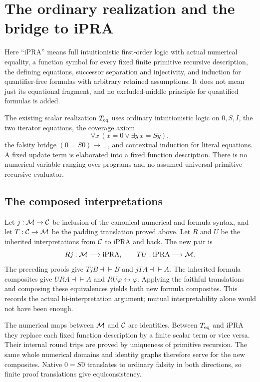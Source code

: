 \section{The ordinary realization and the bridge to iPRA}
\label{sec:new-bridge}

Here ``iPRA'' means full intuitionistic first-order logic with actual
numerical equality, a function symbol for every fixed finite primitive
recursive description, the defining equations, successor separation
and injectivity, and induction for quantifier-free formulas with
arbitrary retained assumptions.  It does not mean just its equational
fragment, and no excluded-middle principle for quantified formulas
is added.

The existing scalar realization $T_{\mathrm{eq}}$ uses ordinary intuitionistic
logic on $0,S,I$, the two iterator equations, the coverage axiom
\[
           \forall x\,(x=0\lor\exists y\,x=Sy),
\]
the falsity bridge $(0=S0)\to\bot$, and contextual induction for
literal equations.  A fixed update term is elaborated into a fixed
function description.  There is no numerical variable ranging over
programs and no assumed universal primitive recursive evaluator.

\subsection{The composed interpretations}
Let $j:\mathcal M\to\mathcal C$ be inclusion of the canonical numerical and
formula syntax, and let $T:\mathcal C\to\mathcal M$ be the padding translation
proved above.  Let $R$ and $U$ be the inherited interpretations from
$\mathcal C$ to iPRA and back.  The new pair is
\[
                  Rj:\mathcal M\longrightarrow\mathrm{iPRA},
       \qquad TU:\mathrm{iPRA}\longrightarrow\mathcal M.
\]
The preceding proofs give $TjB\dashv\vdash B$ and
$jTA\dashv\vdash A$.  The inherited formula composites give
$UR A\dashv\vdash A$ and $RU\varphi\leftrightarrow\varphi$.
Applying the faithful translations and composing these equivalences
yields both new formula composites.  This records the actual
bi-interpretation argument; mutual interpretability alone would not
have been enough.

The numerical maps between $\mathcal M$ and $\mathcal C$ are identities.
Between $T_{\mathrm{eq}}$ and iPRA they replace each fixed function description
by a finite scalar term or vice versa.  Their internal round trips
are proved by uniqueness of primitive recursion.  The same whole
numerical domains and identity graphs therefore serve for the new
composites.  Native $0=S0$ translates to ordinary falsity in both
directions, so finite proof translations give equiconsistency.

